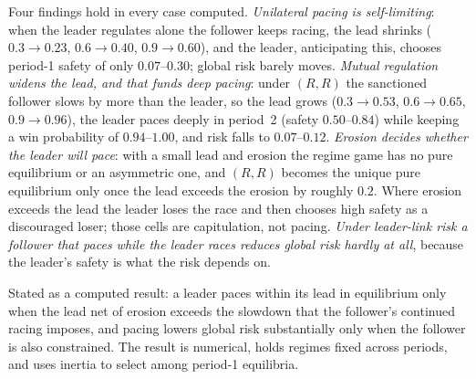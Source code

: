 \documentclass[11pt]{article}
\theoremstyle{plain}
\theoremstyle{definition}
\theoremstyle{remark}
\begin{document}
Four findings hold in every case computed. \emph{Unilateral pacing is self-limiting}: when the leader regulates alone the follower keeps racing, the lead shrinks ($0.3\to0.23$, $0.6\to0.40$, $0.9\to0.60$), and the leader, anticipating this, chooses period-1 safety of only $0.07$--$0.30$; global risk barely moves. \emph{Mutual regulation widens the lead, and that funds deep pacing}: under $(R,R)$ the sanctioned follower slows by more than the leader, so the lead grows ($0.3\to0.53$, $0.6\to0.65$, $0.9\to0.96$), the leader paces deeply in period~2 (safety $0.50$--$0.84$) while keeping a win probability of $0.94$--$1.00$, and risk falls to $0.07$--$0.12$. \emph{Erosion decides whether the leader will pace}: with a small lead and erosion the regime game has no pure equilibrium or an asymmetric one, and $(R,R)$ becomes the unique pure equilibrium only once the lead exceeds the erosion by roughly $0.2$. Where erosion exceeds the lead the leader loses the race and then chooses high safety as a discouraged loser; those cells are capitulation, not pacing. \emph{Under leader-link risk a follower that paces while the leader races reduces global risk hardly at all}, because the leader's safety is what the risk depends on.

Stated as a computed result: a leader paces within its lead in equilibrium only when the lead net of erosion exceeds the slowdown that the follower's continued racing imposes, and pacing lowers global risk substantially only when the follower is also constrained. The result is numerical, holds regimes fixed across periods, and uses inertia to select among period-1 equilibria.
\end{document}
